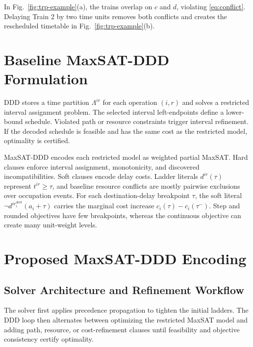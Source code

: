 \documentclass[runningheads]{llncs}
\begin{document}
In Fig.~\ref{fig:trp-example}(a), the trains overlap on $c$ and $d$, violating
\eqref{eq:conflict}. Delaying Train 2 by two time units removes both conflicts
and creates the rescheduled timetable in Fig.~\ref{fig:trp-example}(b).

\section{Baseline MaxSAT-DDD Formulation}

DDD stores a time partition $\Lambda^{ir}$ for each operation $(i,r)$ and
solves a restricted interval assignment problem. The selected interval
left-endpoints define a lower-bound schedule. Violated path or resource
constraints trigger interval refinement. If the decoded schedule is feasible
and has the same cost as the restricted model, optimality is certified.

MaxSAT-DDD encodes each restricted model as weighted partial MaxSAT. Hard
clauses enforce interval assignment, monotonicity, and discovered
incompatibilities. Soft clauses encode delay costs. Ladder literals
$d^{ir}(\tau)$ represent $t^{ir}\ge\tau$, and baseline resource conflicts are
mostly pairwise exclusions over occupation events.
For each destination-delay breakpoint $\tau$, the soft literal
$\neg d^{i r_i^{\mathrm{dest}}}(a_i+\tau)$ carries the marginal cost increase
$c_i(\tau)-c_i(\tau^-)$. Step and rounded objectives have few breakpoints,
whereas the continuous objective can create many unit-weight levels.

\section{Proposed MaxSAT-DDD Encoding}

\subsection{Solver Architecture and Refinement Workflow}

The solver first applies precedence propagation to tighten the initial ladders.
The DDD loop then alternates between optimizing the restricted MaxSAT model and
adding path, resource, or cost-refinement clauses until feasibility and objective
consistency certify optimality.
\end{document}
